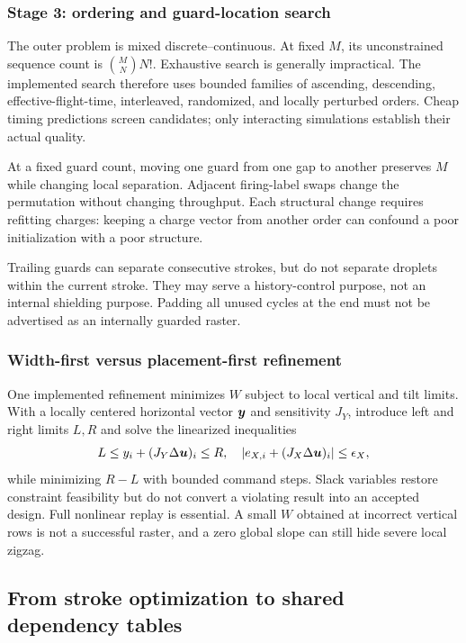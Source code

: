 \subsubsection{Stage 3: ordering and guard-location search}
The outer problem is mixed discrete--continuous. At fixed $M$, its unconstrained sequence count is $\binom{M}{N}N!$. Exhaustive search is generally impractical. The implemented search therefore uses bounded families of ascending, descending, effective-flight-time, interleaved, randomized, and locally perturbed orders. Cheap timing predictions screen candidates; only interacting simulations establish their actual quality.

At a fixed guard count, moving one guard from one gap to another preserves $M$ while changing local separation. Adjacent firing-label swaps change the permutation without changing throughput. Each structural change requires refitting charges: keeping a charge vector from another order can confound a poor initialization with a poor structure.

Trailing guards can separate consecutive strokes, but do not separate droplets within the current stroke. They may serve a history-control purpose, not an internal shielding purpose. Padding all unused cycles at the end must not be advertised as an internally guarded raster.

\subsubsection{Width-first versus placement-first refinement}
One implemented refinement minimizes $W$ subject to local vertical and tilt limits. With a locally centered horizontal vector $\boldsymbol{y}$ and sensitivity $J_Y$, introduce left and right limits $L,R$ and solve the linearized inequalities
\begin{equation}
 L\leq y_i+(J_Y\Delta\boldsymbol{u})_i\leq R,
 \quad |e_{X,i}+(J_X\Delta\boldsymbol{u})_i|\leq\epsilon_X,
\end{equation}
while minimizing $R-L$ with bounded command steps. Slack variables restore constraint feasibility but do not convert a violating result into an accepted design. Full nonlinear replay is essential. A small $W$ obtained at incorrect vertical rows is not a successful raster, and a zero global slope can still hide severe local zigzag.

\subsection{From stroke optimization to shared dependency tables}
